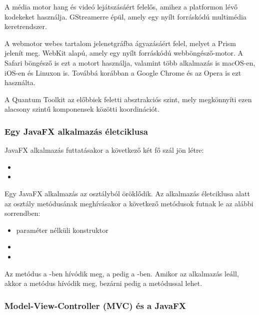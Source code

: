 A média motor hang és videó lejátszásáért felelős, amihez a platformon lévő kodekeket használja.
GStreamerre épül, amely egy nyílt forráskódú multimédia keretrendszer.

A webmotor webes tartalom jelenetgráfba ágyazásáért felel, melyet a Prism jelenít meg.
WebKit alapú, amely egy nyílt forráskódú webböngésző-motor.
A Safari böngésző is ezt a motort használja, valamint több alkalmazás is macOS-en, iOS-en és Linuxon is.
Továbbá korábban a Google Chrome és az Opera is ezt használta.

A Quantum Toolkit az előbbiek feletti absztrakciós szint, mely megkönnyíti ezen alacsony szintű komponensek közötti koordinációt.


\subsubsection*{Egy JavaFX alkalmazás életciklusa}

JavaFX alkalmazás futtatásakor a következő két fő szál jön létre: 

\begin{itemize}
\setlength\itemsep{0em}
\item {}
\item {}
\end{itemize}

Egy JavaFX alkalmazás az  osztályból öröklődik.
Az alkalmazás életciklusa alatt az  osztály  metódusának meghívásakor a következő metódusok futnak le az alábbi sorrendben: 

\begin{itemize}
\setlength\itemsep{0em}
\item paraméter nélküli konstruktor 
\item {}
\item {}
\end{itemize}

Az  metódus a -ben hívódik meg, a  pedig a -ben.\cite{javafx3}
Amikor az alkalmazás leáll, akkor a  metódus hívódik meg, bezárni pedig a  metódussal lehet.  

\subsubsection*{Model-View-Controller (MVC) és a JavaFX}

